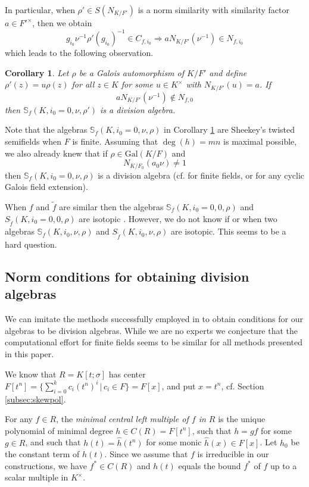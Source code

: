 \documentclass[12pt]{amsart}
\theoremstyle{plain}
\newtheorem{corollary}[theorem]{Corollary}
\theoremstyle{definition}
\numberwithin{equation}{section}
\numberwithin{figure}{section}
\newcommand{\Gal}{\mathrm{Gal}}
\begin{document}
In particular,   when $\rho'\in S(N_{K/F'})$ is a norm  similarity with similarity factor $a\in F'^\times$, then we obtain
$$ g_{i_0}\nu^{-1}\rho'(g_{i_0})^{-1}\in C_{f,{i_0}}\Rightarrow a N_{K/F'}(\nu^{-1})\in N_{f,{i_0}}$$
which leads to the following observation.


\begin{corollary}\label{cor:Sh2}
 Let
 $\rho$  be a Galois automorphism of $K/F'$ and define $\rho'(z)=u\rho(z)$ for all $z\in K$ for some $u\in K^\times$ with $N_{K/F'}(u)=a$.
If
$$ aN_{K/F'}(\nu^{-1})\not\in N_{f,{0}}$$
then $\mathbb{S}_f(K,i_0=0,\nu,\rho')$ is a division algebra.
\end{corollary}

  Note that the algebras $\mathbb{S}_f(K,i_0=0,\nu,\rho)$ in Corollary \ref{cor:Sh2} are Sheekey's twisted semifields when $F$ is finite.  Assuming that  $\deg(h)=mn$ is maximal possible, we also already knew that if $\rho\in \Gal(K/F)$ and
  $$N_{K/F_0}(a_0 \nu)\not=1$$
   then $\mathbb{S}_f(K,i_0=0,\nu,\rho)$ is a division algebra (cf. \cite[Theorem 7]{Sheekey} for finite fields, or  \cite[Theorem 22]{PT} for any cyclic Galois field extension).


 When $f$ and $\tilde f$ are similar then the algebras $\mathbb{S}_f(K,i_0=0,0,\rho)$ and $S_{\tilde f}(K,i_0=0,0,\rho)$ are isotopic  \cite{Pum2025}. However, we do not know if or when two algebras $\mathbb{S}_f(K,i_0,\nu,\rho)$ and $S_{\tilde f}(K,i_0,\nu,\rho)$ are isotopic. This seems to be a hard question.


\subsection{Norm conditions for obtaining division algebras}

We can imitate the methods successfully employed in \cite{Sheekey, NewS} to obtain conditions for our algebras to be division algebras.
 While we are no experts we conjecture that the computational effort for finite fields seems to be similar for all methods presented in this paper.


 We know that
 $R=K[t;\sigma]$  has center
$ F[t^n]=\{\sum_{i=0}^{k}c_i(t^n)^i\,|\, c_i\in F \}= F[x]$, and put $x=t^n$, cf. Section \ref{subsec:skewpol}.

For any $f \in R$, the \emph{minimal central left multiple of $f$ in $R$} is the unique  polynomial of minimal degree $h \in C(R)=F[t^n]$,
such that $h = gf$ for some $g \in R$, and such that $h(t)=\hat{h}(t^n)$ for some monic $\hat{h}(x) \in F[x]$. Let $h_0$ be the constant term of $h(t)$.
  Since we assume that $f$ is irreducible in our constructions, we have $f^*\in C(R)$ \cite[Lemma 2.11]{GLN18} and $h(t)$ equals the bound $f^*$ of $f$ up to a scalar multiple in $K^\times$.
\end{document}
